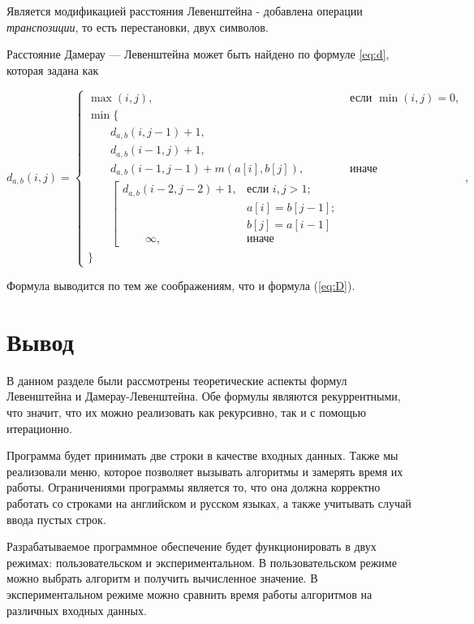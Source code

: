 Является модификацией расстояния Левенштейна - добавлена операции \textit{транспозиции}, то есть перестановки, двух символов.

Расстояние Дамерау — Левенштейна может быть найдено по формуле \ref{eq:d}, которая задана как


\begin{equation}
	\label{eq:d}
	d_{a,b}(i, j) = \begin{cases}
		\max(i, j), &\text{если }\min(i, j) = 0,\\
		\min \lbrace \\
		\qquad d_{a,b}(i, j-1) + 1,\\
		\qquad d_{a,b}(i-1, j) + 1,\\
		\qquad d_{a,b}(i-1, j-1) + m(a[i], b[j]), &\text{иначе}\\
		\qquad \left[ \begin{array}{cc}d_{a,b}(i-2, j-2) + 1, &\text{если }i,j > 1;\\
			\qquad &\text{}a[i] = b[j-1]; \\
			\qquad &\text{}b[j] = a[i-1]\\
			\qquad \infty, & \text{иначе}\end{array}\right.\\
		\rbrace
	\end{cases},
\end{equation}

Формула выводится по тем же соображениям, что и формула (\ref{eq:D}).


\section{Вывод}
В данном разделе были рассмотрены теоретические аспекты формул Левенштейна и Дамерау-Левенштейна. Обе формулы являются рекуррентными, что значит, что их можно реализовать как рекурсивно, так и с помощью итерационно.

Программа будет принимать две строки в качестве входных данных. Также мы реализовали меню, которое позволяет вызывать алгоритмы и замерять время их работы. Ограничениями программы является то, что она должна корректно работать со строками на английском и русском языках, а также учитывать случай ввода пустых строк.

Разрабатываемое программное обеспечение будет функционировать в двух режимах: пользовательском и экспериментальном. В пользовательском режиме можно выбрать алгоритм и получить вычисленное значение. В экспериментальном режиме можно сравнить время работы алгоритмов на различных входных данных. 
